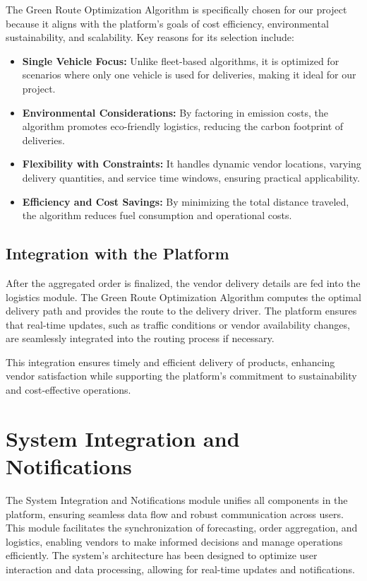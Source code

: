 The Green Route Optimization Algorithm is specifically chosen for our project because it aligns with the platform's goals of cost efficiency, environmental sustainability, and scalability. Key reasons for its selection include:

\begin{itemize}
    \item \textbf{Single Vehicle Focus:} Unlike fleet-based algorithms, it is optimized for scenarios where only one vehicle is used for deliveries, making it ideal for our project.
    \item \textbf{Environmental Considerations:} By factoring in emission costs, the algorithm promotes eco-friendly logistics, reducing the carbon footprint of deliveries.
    \item \textbf{Flexibility with Constraints:} It handles dynamic vendor locations, varying delivery quantities, and service time windows, ensuring practical applicability.
    \item \textbf{Efficiency and Cost Savings:} By minimizing the total distance traveled, the algorithm reduces fuel consumption and operational costs.
\end{itemize}

\subsection{Integration with the Platform}

After the aggregated order is finalized, the vendor delivery details are fed into the logistics module. The Green Route Optimization Algorithm computes the optimal delivery path and provides the route to the delivery driver. The platform ensures that real-time updates, such as traffic conditions or vendor availability changes, are seamlessly integrated into the routing process if necessary.

This integration ensures timely and efficient delivery of products, enhancing vendor satisfaction while supporting the platform's commitment to sustainability and cost-effective operations.

\section{System Integration and Notifications}

The System Integration and Notifications module unifies all components in the platform, ensuring seamless data flow and robust communication across users. This module facilitates the synchronization of forecasting, order aggregation, and logistics, enabling vendors to make informed decisions and manage operations efficiently. The system's architecture has been designed to optimize user interaction and data processing, allowing for real-time updates and notifications.

